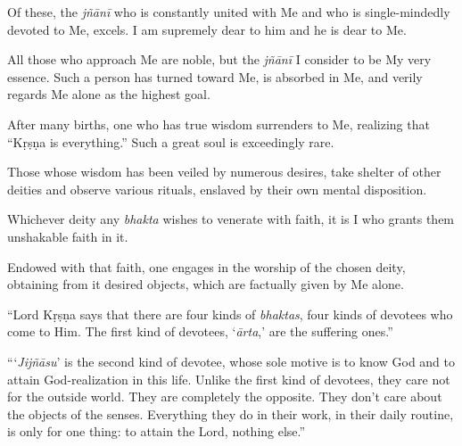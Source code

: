 {Of these, the \textit{jñānī} who is constantly united with Me and who is single-mindedly devoted to Me, excels. I am supremely dear to him and he is dear to Me.}

{All those who approach Me are noble, but the \textit{jñānī} I consider to be My very essence. Such a person has turned toward Me, is absorbed in Me, and verily regards Me alone as the highest goal.}

{After many births, one who has true wisdom surrenders to Me, realizing that \enquote{Kṛṣṇa is everything.} Such a great soul is exceedingly rare.}

{Those whose wisdom has been veiled by numerous desires, take shelter of other deities and observe various rituals, enslaved by their own mental disposition.}

{Whichever deity any \textit{bhakta} wishes to venerate with faith, it is I who grants them unshakable faith in it.}

{Endowed with that faith, one engages in the worship of the chosen deity, obtaining from it desired objects, which are factually given by Me alone.}


\enquote{Lord Kṛṣṇa says that there are four kinds of \textit{bhaktas}, four kinds of devotees who come to Him. The first kind of devotees, \enquote{\textit{ārta},} are the suffering ones.}

\enquote{\enquote{\textit{Jijñāsu}} is the second kind of devotee, whose sole motive is to know God and to attain God-realization in this life. Unlike the first kind of devotees, they care not for the outside world. They are completely the opposite. They don’t care about the objects of the senses. Everything they do in their work, in their daily routine, is only for one thing: to attain the Lord, nothing else.}

